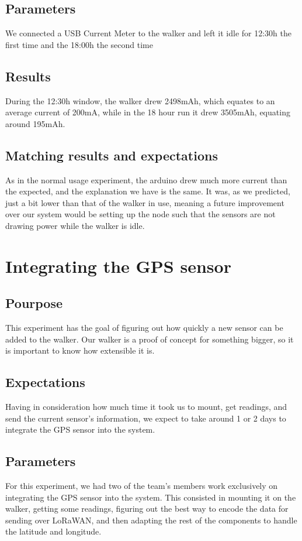 	\subsection{Parameters}
		We connected a USB Current Meter to the walker and left it idle for 12:30h the first time and the 18:00h the second time
	\subsection{Results}
		During the 12:30h window, the walker drew 2498mAh, which equates to an average current of 200mA, while in the 18 hour run it drew 3505mAh, equating around 195mAh.
	\subsection{Matching results and expectations}
		As in the normal usage experiment, the arduino drew much more current than the expected, and the explanation we have is the same. It was, as we predicted, just a bit lower than that of the walker in use, meaning a future improvement over our system would be setting up the node such that the sensors are not drawing power while the walker is idle.

\section{Integrating the GPS sensor}
	\subsection{Pourpose}
	This experiment has the goal of figuring out how quickly a new sensor can be added to the walker. Our walker is a proof of concept for something bigger, so it is important to know how extensible it is.

	\subsection{Expectations}
	Having in consideration how much time it took us to mount, get readings, and send the current sensor's information, we expect to take around 1 or 2 days to integrate the GPS sensor into the system. 

	\subsection{Parameters}
	For this experiment, we had two of the team's members work exclusively on integrating the GPS sensor into the system. This consisted in mounting it on the walker, getting some readings, figuring out the best way to encode the data for sending over LoRaWAN, and then adapting the rest of the components to handle the latitude and longitude.

